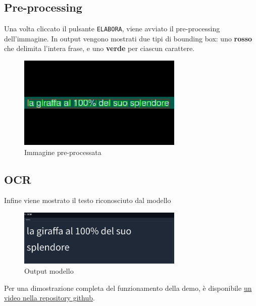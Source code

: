 \subsection*{Pre-processing}
Una volta cliccato il pulsante \texttt{ELABORA}, viene avviato il pre-processing dell'immagine. In output vengono mostrati due tipi di bounding box: uno \textbf{rosso} che delimita l'intera frase, e uno \textbf{verde} per ciascun carattere.

\begin{figure}[H]
    \centering
    \includegraphics[width=0.7\textwidth]{images/demo-2fasedetail.png}
    \caption{Immagine pre-processata}
    \label{fig:demo-2fase}
\end{figure}

\subsection*{OCR}
Infine viene mostrato il testo riconosciuto dal modello
\begin{figure}[H]
    \centering
    \includegraphics[width=0.7\textwidth]{images/demo-3fase.png}
    \caption{Output modello}
    \label{fig:demo-3fase}
\end{figure}

Per una dimostrazione completa del funzionamento della demo, è disponibile \href{https://github.com/user-attachments/assets/c438a7b3-e5fd-433e-a72f-7376223e9067}{un video nella repository github}.